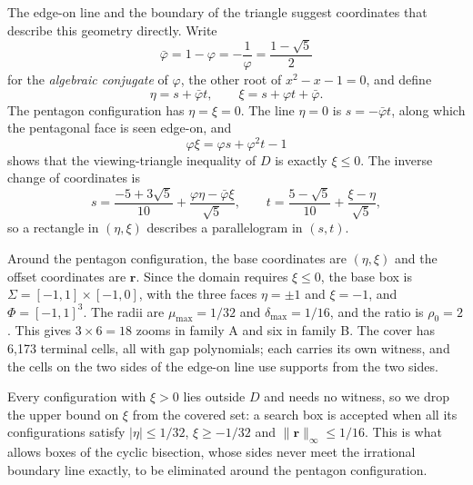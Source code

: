The edge-on line and the boundary of the triangle suggest coordinates that
describe this geometry directly. Write
\[
  \bar{\varphi}=1-\varphi=-\frac1{\varphi}
      =\frac{1-\sqrt5}{2}
\]
for the \emph{algebraic conjugate} of $\varphi$, the other root of
$x^2-x-1=0$, and define
\begin{equation}\label{eq:pentagon-local-view}
  \eta=s+\bar{\varphi}t,\qquad \xi=s+\varphi t+\bar{\varphi}.
\end{equation}
The pentagon configuration has $\eta=\xi=0$. The line $\eta=0$ is
$s=-\bar{\varphi}t$, along which the pentagonal face is seen edge-on, and
\[
  \varphi\xi=\varphi s+\varphi^2t-1
\]
shows that the viewing-triangle inequality of $D$ is exactly $\xi\le0$.
The inverse change of coordinates is
\begin{equation}\label{eq:pentagon-inverse-view}
  s=\frac{-5+3\sqrt5}{10}
       +\frac{\varphi\eta-\bar{\varphi}\xi}{\sqrt5},\qquad
  t=\frac{5-\sqrt5}{10}+\frac{\xi-\eta}{\sqrt5},
\end{equation}
so a rectangle in $(\eta,\xi)$ describes a parallelogram in $(s,t)$.

Around the pentagon configuration, the base coordinates are $(\eta,\xi)$
and the offset coordinates are $\mathbf r$. Since the domain requires
$\xi\le0$, the base box is $\Sigma=[-1,1]\times[-1,0]$, with the three faces
$\eta=\pm1$ and $\xi=-1$, and $\Phi={[-1,1]}^3$. The radii are
$\mu_{\max}=1/32$ and $\delta_{\max}=1/16$, and the ratio is $\rho_0=2$. This
gives $3\times6=18$ zooms in family A and six in family B. The cover has
6,173 terminal cells, all with gap polynomials; each carries its own
witness, and the cells on the two sides of the edge-on line use supports
from the two sides.

Every configuration with $\xi>0$ lies outside $D$ and needs no witness, so
we drop the upper bound on $\xi$ from the covered set: a search box is
accepted when all its configurations satisfy $|\eta|\le1/32$,
$\xi\ge-1/32$ and $\lVert\mathbf r\rVert_\infty\le1/16$. This is what allows
boxes of the cyclic bisection, whose sides never meet the irrational
boundary line exactly, to be eliminated around the pentagon configuration.

